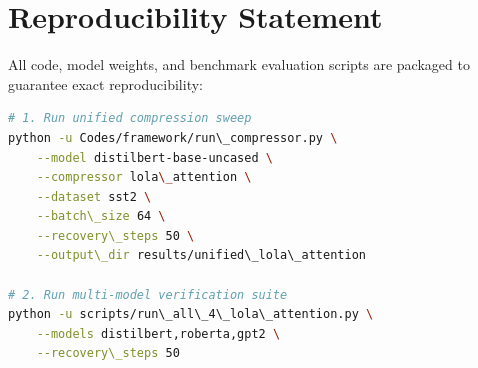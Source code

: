\section{Reproducibility Statement}
All code, model weights, and benchmark evaluation scripts are packaged to guarantee exact reproducibility:
\begin{lstlisting}[language=bash]
# 1. Run unified compression sweep
python -u Codes/framework/run\_compressor.py \
    --model distilbert-base-uncased \
    --compressor lola\_attention \
    --dataset sst2 \
    --batch\_size 64 \
    --recovery\_steps 50 \
    --output\_dir results/unified\_lola\_attention

# 2. Run multi-model verification suite
python -u scripts/run\_all\_4\_lola\_attention.py \
    --models distilbert,roberta,gpt2 \
    --recovery\_steps 50
\end{lstlisting}
